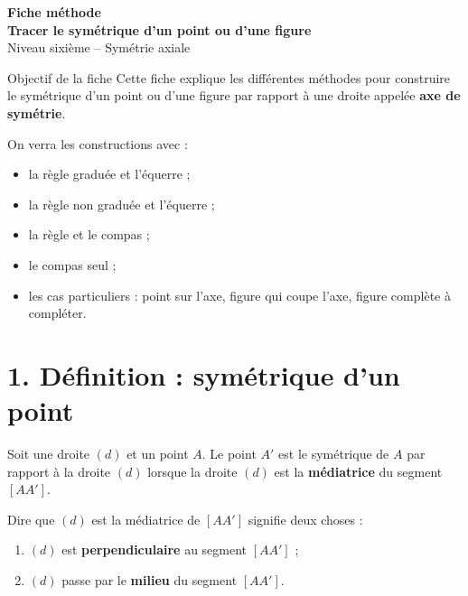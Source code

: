 \documentclass[11pt,a4paper]{article}
\newcommand{\important}[1]{\textcolor{rouge}{\textbf{#1}}}
\begin{document}
\begin{center}
    {\Large \textbf{Fiche méthode}}\\[0.15cm]
    {\LARGE \textbf{Tracer le symétrique d'un point ou d'une figure}}\\[0.15cm]
    {\large Niveau sixième -- Symétrie axiale}
\end{center}

\vspace{0.3cm}

\begin{boite}{Objectif de la fiche}
Cette fiche explique les différentes méthodes pour construire le symétrique d'un point ou d'une figure par rapport à une droite appelée \textbf{axe de symétrie}.  

On verra les constructions avec :
\begin{itemize}[label=\textbullet]
    \item la règle graduée et l'équerre ;
    \item la règle non graduée et l'équerre ;
    \item la règle et le compas ;
    \item le compas seul ;
    \item les cas particuliers : point sur l'axe, figure qui coupe l'axe, figure complète à compléter.
\end{itemize}
\end{boite}

\section*{1. Définition : symétrique d'un point}

Soit une droite $(d)$ et un point $A$.  
Le point $A'$ est le symétrique de $A$ par rapport à la droite $(d)$ lorsque la droite $(d)$ est la \textbf{médiatrice} du segment $[AA']$.

\begin{retenir}
Dire que $(d)$ est la médiatrice de $[AA']$ signifie deux choses :
\begin{enumerate}[label=\arabic*)]
    \item $(d)$ est \important{perpendiculaire} au segment $[AA']$ ;
    \item $(d)$ passe par le \important{milieu} du segment $[AA']$.
\end{enumerate}
\end{retenir}
\end{document}
